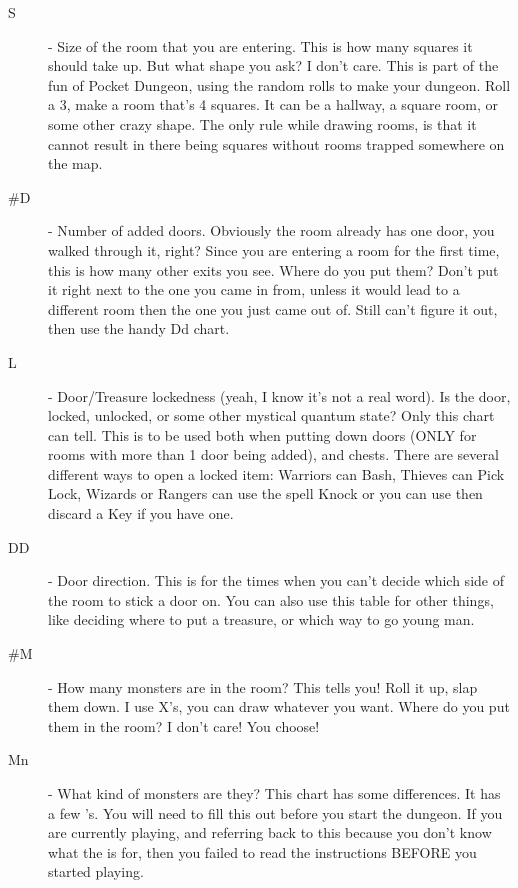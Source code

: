\documentclass[a6paper,hidelinks]{article}
\makeatletter
\def\namedlabel#1#2{\begingroup
    #2%
    \def\@currentlabel{#2}%
    \phantomsection\label{#1}\endgroup
}
\makeatother
\begin{document}
\begin{description}
\item[\namedlabel{itm:srt_S}{S}] - Size of the room that you are entering. This is how many squares it should take up. But what shape you ask? I don't care. This is part of the fun of Pocket Dungeon, using the random rolls to make your dungeon. Roll a 3, make a room that’s 4 squares. It can be a hallway, a square room, or some other crazy shape. The only rule while drawing rooms, is that it cannot result in there being squares without rooms trapped somewhere on the map.

\item[\namedlabel{itm:srt_D}{\#D}] - Number of added doors. Obviously the room already has one door, you walked through it, right? Since you are entering a room for the first time, this is how many other exits you see. Where do you put them? Don't put it right next to the one you came in from, unless it would lead to a different room then the one you just came out of. Still can't figure it out, then use the handy Dd chart.

\item[\namedlabel{itm:srt_L}{L}] - Door/Treasure lockedness (yeah, I know it’s not a real word). Is the door, locked, unlocked, or some other mystical quantum state? Only this chart can tell. This is to be used both when putting down doors (ONLY for rooms with more than 1 door being added), and chests. There are several different ways to open a locked item: Warriors can Bash, Thieves can Pick Lock, Wizards or Rangers can use the spell Knock or you can use then discard a Key if you have one.

\item[\namedlabel{itm:srt_DD}{DD}] - Door direction. This is for the times when you can't decide which side of the room to stick a door on. You can also use this table for other things, like deciding where to put a treasure, or which way to go young man.

\item[\namedlabel{itm:srt_M}{\#M}] - How many monsters are in the room? This tells you! Roll it up, slap them down. I use X's, you can draw whatever you want. Where do you put them in the room? I don't care! You choose!

\item[\namedlabel{itm:srt_Mn}{Mn}] - What kind of monsters are they? This chart has some differences. It has a few \underline{\hspace*{1cm}}'s. You will need to fill this out before you start the dungeon. If you are currently playing, and referring back to this because you don't know what the \underline{\hspace*{1cm}} is for, then you failed to read the instructions BEFORE you started playing.


\end{description}
\end{document}
